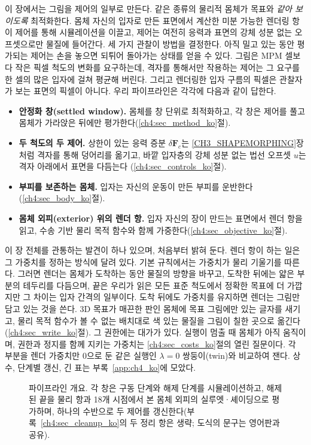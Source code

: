 이 장에서는 그림을 제어의 일부로 만든다. 같은 종류의 물리적 몸체가 목표와 \emph{같아 보이도록} 최적화한다. 몸체 자신의
입자로 만든 표면에서 계산한 미분 가능한 렌더링 항이 제어를 통해 시뮬레이션을 이끌고, 제어는 여전히 응력과 표면의 강체
성분 없는 오프셋으로만 물질에 들어간다. 세 가지 관찰이 방법을 결정한다. 아직 밀고 있는 동안 평가되는 제어는 손을 놓으면
되튀어 돌아가는 상태를 얻을 수 있다. 그림은 MPM 셀보다 작은 픽셀 척도의 변화를 요구하는데, 격자를 통해서만 작용하는
제어는 그 요구를 한 셀의 많은 입자에 걸쳐 평균해 버린다. 그리고 렌더링한 입자 구름의 픽셀은 관찰자가 보는 표면의 픽셀이
아니다. 우리 파이프라인은 각각에 다음과 같이 답한다.
\begin{itemize}
  \item \textbf{안정화 창(settled window).} 몸체를 창 단위로 최적화하고, 각 창은 제어를 풀고 몸체가 가라앉은 뒤에만
        평가한다(\ref{ch4:sec_method_ko}절).
  \item \textbf{두 척도의 두 제어.} 상한이 있는 응력 증분 $\delta\mathbf{F}_c$는 \ref{CH3_SHAPEMORPHING}장처럼 격자를 통해
        덩어리를 옮기고, 바깥 입자층의 강체 성분 없는 법선 오프셋 $u$는 격자 아래에서 표면을 다듬는다
        (\ref{ch4:sec_controls_ko}절).
  \item \textbf{부피를 보존하는 몸체.} 입자는 자신의 운동이 만든 부피를 운반한다(\ref{ch4:sec_body_ko}절).
  \item \textbf{몸체 외피(exterior) 위의 렌더 항.} 입자 자신의 장이 만드는 표면에서 렌더 항을 읽고, 수송 기반 물리 목적
        함수와 함께 가중한다(\ref{ch4:sec_objective_ko}절).
\end{itemize}

이 장 전체를 관통하는 발견이 하나 있으며, 처음부터 밝혀 둔다. 렌더 항이 하는 일은 그 가중치를 정하는 방식에 달려 있다.
기본 규칙에서는 가중치가 물리 기울기를 따른다. 그러면 렌더는 몸체가 도착하는 동안 물질의 방향을 바꾸고, 도착한 뒤에는 얇은
부분의 테두리를 다듬으며, 끝은 우리가 읽은 모든 표준 척도에서 정확한 목표에 더 가깝지만 그 차이는 입자 간격의 일부이다.
도착 뒤에도 가중치를 유지하면 렌더는 그림만 담고 있는 것을 쓴다. 3D 목표가 매끈한 판인 몸체에 목표 그림에만 있는 글자를
새기고, 물리 목적 함수가 볼 수 없는 배치대로 색 있는 물질을 그림이 칠한 곳으로 옮긴다(\ref{ch4:sec_write_ko}절). 그 권한에는
대가가 있다. 실행이 멈출 때 몸체가 아직 움직이며, 권한과 정지를 함께 지키는 가중치는 \ref{ch4:sec_costs_ko}절의 열린 질문이다.
각 부분을 렌더 가중치만 0으로 둔 같은 실행인 $\lambda=0$ 쌍둥이(twin)와 비교하여 잰다. 상수, 단계별 갱신, 긴 표는 부록~\ref{app:ch4_ko}에 모았다.

\begin{figure}[t]
    \centering
    \resizebox{\textwidth}{!}{}
    \caption{파이프라인 개요. \textmd{각 창은 구동 단계와 해제 단계를 시뮬레이션하고, 해제된 끝을 물리 항과 18개 시점에서
    본 몸체 외피의 실루엣·셰이딩으로 평가하며, 하나의 수반으로 두 제어를 갱신한다(부록~\ref{ch4:sec_cleanup_ko}의 두 정리
    항은 생략; 도식의 문구는 영어판과 공유).}}
    \label{fig:overview_ko}
\end{figure}

